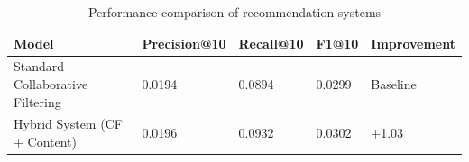 \begin{table}
\caption{Performance comparison of recommendation systems}
\label{tab:results}
\begin{tabular}{lllll}
\toprule
Model & Precision@10 & Recall@10 & F1@10 & Improvement \\
\midrule
Standard Collaborative Filtering & 0.0194 & 0.0894 & 0.0299 & Baseline \\
Hybrid System (CF + Content) & 0.0196 & 0.0932 & 0.0302 & +1.03%
\bottomrule
\end{tabular}
\end{table}

